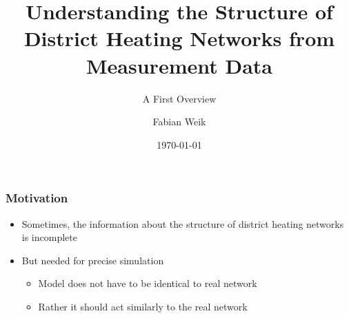 \documentclass{beamer}
\title{Understanding the Structure of District Heating Networks from Measurement Data}
\subtitle{A First Overview}
\author{Fabian Weik}
\institute{Fraunhofer ITWM}
\date{\today}
\begin{document}
\frame{\titlepage}

\begin{frame}
\frametitle{Motivation}
  \begin{itemize}
    \item Sometimes, the information about the structure of district heating networks is incomplete
    \item But needed for precise simulation
      \begin{itemize}
        \item Model does not have to be identical to real network
        \item Rather it should act similarly to the real network
      \end{itemize}
  \end{itemize}
\end{frame}

%
%
%
\end{document}

